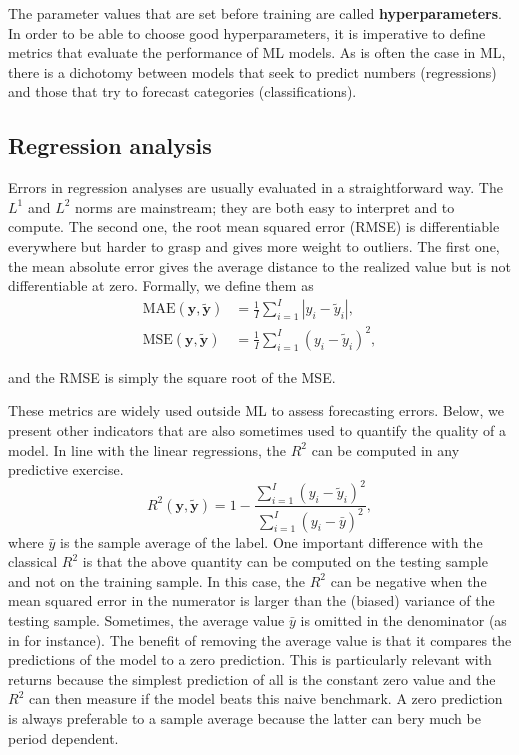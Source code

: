 \documentclass[]{krantz}
\theoremstyle{definition}
\theoremstyle{definition}
\theoremstyle{definition}
\theoremstyle{remark}
\begin{document}
The parameter values that are set before training are called
\textbf{hyperparameters}. In order to be able to choose good
hyperparameters, it is imperative to define metrics that evaluate the
performance of ML models. As is often the case in ML, there is a
dichotomy between models that seek to predict numbers (regressions) and
those that try to forecast categories (classifications).

\hypertarget{regression-analysis}{%
\subsection{Regression analysis}\label{regression-analysis}}

Errors in regression analyses are usually evaluated in a straightforward
way. The \(L^1\) and \(L^2\) norms are mainstream; they are both easy to
interpret and to compute. The second one, the root mean squared error
(RMSE) is differentiable everywhere but harder to grasp and gives more
weight to outliers. The first one, the mean absolute error gives the
average distance to the realized value but is not differentiable at
zero. Formally, we define them as \begin{align}
 \label{eq:MAE}
\text{MAE}(\textbf{y},\tilde{\textbf{y}})&=\frac{1}{I}\sum_{i=1}^I|y_i-\tilde{y}_i|, \\  \label{eq:MSE} 
\text{MSE}(\textbf{y},\tilde{\textbf{y}})&=\frac{1}{I}\sum_{i=1}^I(y_i-\tilde{y}_i)^2, 
\end{align}

and the RMSE is simply the square root of the MSE.

These metrics are widely used outside ML to assess forecasting errors.
Below, we present other indicators that are also sometimes used to
quantify the quality of a model. In line with the linear regressions,
the \(R^2\) can be computed in any predictive exercise. \begin{equation}
\label{eq:R2} 
R^2(\textbf{y},\tilde{\textbf{y}})=1- \frac{\sum_{i=1}^I(y_i-\tilde{y}_i)^2}{\sum_{i=1}^I(y_i-\bar{y})^2},
\end{equation} where \(\bar{y}\) is the sample average of the label. One
important difference with the classical \(R^2\) is that the above
quantity can be computed on the testing sample and not on the training
sample. In this case, the \(R^2\) can be negative when the mean squared
error in the numerator is larger than the (biased) variance of the
testing sample. Sometimes, the average value \(\bar{y}\) is omitted in
the denominator (as in \citet{gu2018empirical} for instance). The
benefit of removing the average value is that it compares the
predictions of the model to a zero prediction. This is particularly
relevant with returns because the simplest prediction of all is the
constant zero value and the \(R^2\) can then measure if the model beats
this naive benchmark. A zero prediction is always preferable to a sample
average because the latter can bery much be period dependent.
\end{document}

